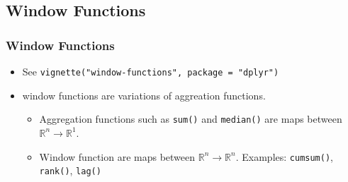 \documentclass{beamer}\usepackage[]{graphicx}\usepackage[]{color}
\begin{document}
\subsection{Window Functions}%
\begin{frame}[fragile]
  \frametitle{Window Functions}
  \begin{itemize}
    \item See {\tt vignette("window-functions", package = "dplyr")}

    \item window functions are variations of aggreation functions.

      \begin{itemize}
        \item Aggregation functions such as {\tt sum()} and {\tt median()} are
          maps between $\mathbb{R}^n \rightarrow \mathbb{R}^1$.
        \item Window function are maps between $\mathbb{R}^n \rightarrow \mathbb{R}^n$.
          Examples: {\tt cumsum()}, {\tt rank()}, {\tt lag()}
      \end{itemize} 
  \end{itemize} 
\end{frame} 
\end{document}
